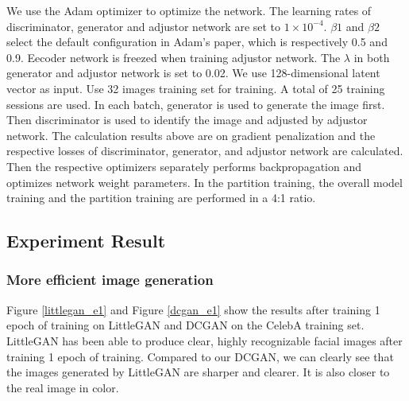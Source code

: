We use the Adam optimizer to optimize the network.
The learning rates of discriminator, generator and adjustor network are set to $1\times10^{-4}$.
$\beta1$ and $\beta2$ select the default configuration in Adam's paper, which is respectively 0.5 and 0.9.
Eecoder network is freezed when training adjustor network.
The $\lambda$ in both generator and adjustor network is set to 0.02.
We use 128-dimensional latent vector as input.
Use 32 images training set  for training.
A total of 25 training sessions are used.
In each batch, generator is used to generate the image first.
Then discriminator is used to identify the image and adjusted by adjustor network.
The calculation results above are on gradient penalization and the respective losses of discriminator, generator, and adjustor network are calculated.
Then the respective optimizers separately performs backpropagation and optimizes network weight parameters.
In the partition training, the overall model training and the partition training are performed in a 4:1 ratio.

\subsection{Experiment Result}
\subsubsection*{More efficient image generation} 
Figure \ref{littlegan_e1} and Figure \ref{dcgan_e1} show the results after training 1 epoch of training on LittleGAN and DCGAN on the CelebA training set.
LittleGAN has been able to produce clear, highly recognizable facial images after training 1 epoch of training.
Compared to our DCGAN, we can clearly see that the images generated by LittleGAN are sharper and clearer.
It is also closer to the real image in color.

